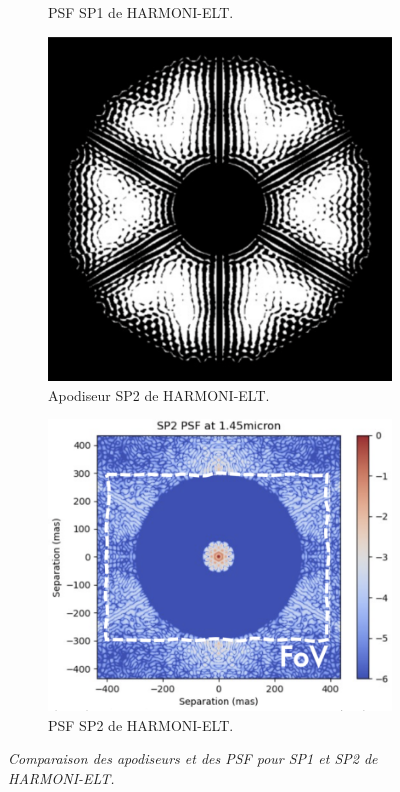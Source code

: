 \begin{figure}[htbp]
\begin{subfigure}[b]{0.45\textwidth}
\caption{PSF SP1 de HARMONI-ELT.}
\end{subfigure}
\begin{subfigure}[b]{0.40\textwidth}
    \centering
    \includegraphics[width=\textwidth]{figures/SP2_HARMONI.png}
    \caption{Apodiseur SP2 de HARMONI-ELT.}
\end{subfigure}
\hfill %
\begin{subfigure}[b]{0.45\textwidth}
    \centering
    \includegraphics[width=\textwidth]{figures/PSF_SP2_HARMONI.png}
    \caption{PSF SP2 de HARMONI-ELT.}
\end{subfigure}

\caption{\textit{Comparaison des apodiseurs et des PSF pour SP1 et SP2 de HARMONI-ELT.}}
\end{figure}

